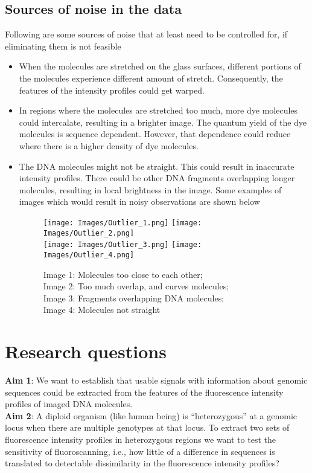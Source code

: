 \subsection{Sources of noise in the data} \label{sec_noise}
Following are some sources of noise that at least need to be controlled for, if eliminating them is not feasible
\begin{itemize}
\item When the molecules are stretched on the glass surfaces, different portions of the molecules experience different amount of stretch. Consequently, the features of the intensity profiles could get warped. 
\item In regions where the molecules are stretched too much, more dye molecules could intercalate, resulting in a brighter image. The quantum yield of the dye molecules is sequence dependent. However, that dependence could reduce where there is a higher density of dye molecules. 
\item The DNA molecules might not be straight. This could result in inaccurate intensity profiles. There could be other DNA fragments overlapping longer molecules, resulting in local brightness in the image. Some examples of images which would result in noisy observations are shown below
\begin{figure}[H]
\begin{center}
\texttt{[image: Images/Outlier\_1.png]}
\texttt{[image: Images/Outlier\_2.png]} \\
\texttt{[image: Images/Outlier\_3.png]}
\texttt{[image: Images/Outlier\_4.png]}
\end{center}
\caption{Image 1: Molecules too close to each other; \\ Image 2: Too much overlap, and curves molecules; \\Image 3: Fragments overlapping DNA molecules; \\Image 4: Molecules not straight}
\label{fig:Fig2_OutlierImages}
\end{figure}

\end{itemize}

\section{Research questions}
\noindent
{\bf{Aim 1}}: We want to establish that usable signals with information about genomic sequences could be extracted from the features of the fluorescence intensity profiles of imaged DNA molecules. \\
\noindent
{\bf{Aim 2}}: A diploid organism (like human being) is ``heterozygous'' at a genomic locus when there are multiple genotypes at that locus. To extract two sets of fluorescence intensity profiles in heterozygous regions we want to test the sensitivity of fluoroscanning, i.e., how little of a difference in sequences is translated to detectable dissimilarity in the fluorescence intensity profiles? \\

